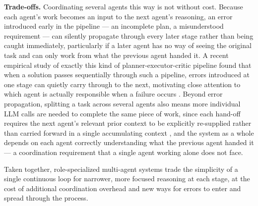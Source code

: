 \textbf{Trade-offs.} Coordinating several agents this way is not without cost. Because each agent's work becomes an input to the next agent's reasoning, an error introduced early in the pipeline --- an incomplete plan, a misunderstood requirement --- can silently propagate through every later stage rather than being caught immediately, particularly if a later agent has no way of seeing the original task and can only work from what the previous agent handed it. A recent empirical study of exactly this kind of planner-executor-critic pipeline found that when a solution passes sequentially through such a pipeline, errors introduced at one stage can quietly carry through to the next, motivating close attention to which agent is actually responsible when a failure occurs \cite{barrak2025traceability}. Beyond error propagation, splitting a task across several agents also means more individual LLM calls are needed to complete the same piece of work, since each hand-off requires the next agent's relevant prior context to be explicitly re-supplied rather than carried forward in a single accumulating context \cite{li2025check}, and the system as a whole depends on each agent correctly understanding what the previous agent handed it --- a coordination requirement that a single agent working alone does not face.

Taken together, role-specialized multi-agent systems trade the simplicity of a single continuous loop for narrower, more focused reasoning at each stage, at the cost of additional coordination overhead and new ways for errors to enter and spread through the process.


